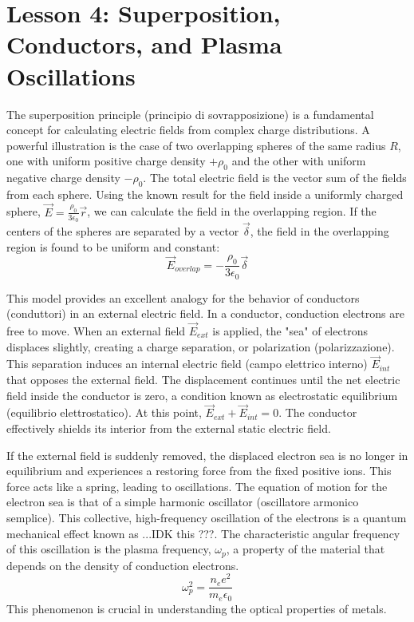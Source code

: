 \section*{Lesson 4: Superposition, Conductors, and Plasma Oscillations}

The superposition principle (principio di sovrapposizione) is a fundamental concept for calculating electric fields from complex charge distributions. A powerful illustration is the case of two overlapping spheres of the same radius $R$, one with uniform positive charge density $+\rho_0$ and the other with uniform negative charge density $-\rho_0$. The total electric field is the vector sum of the fields from each sphere. Using the known result for the field inside a uniformly charged sphere, $\vec{E} = \frac{\rho_0}{3\epsilon_0}\vec{r}$, we can calculate the field in the overlapping region. If the centers of the spheres are separated by a vector $\vec{\delta}$, the field in the overlapping region is found to be uniform and constant:
\begin{equation}
\vec{E}_{overlap} = -\frac{\rho_0}{3\epsilon_0}\vec{\delta}
\end{equation}

This model provides an excellent analogy for the behavior of conductors (conduttori) in an external electric field. In a conductor, conduction electrons are free to move. When an external field $\vec{E}_{ext}$ is applied, the "sea" of electrons displaces slightly, creating a charge separation, or polarization (polarizzazione). This separation induces an internal electric field (campo elettrico interno) $\vec{E}_{int}$ that opposes the external field. The displacement continues until the net electric field inside the conductor is zero, a condition known as electrostatic equilibrium (equilibrio elettrostatico). At this point, $\vec{E}_{ext} + \vec{E}_{int} = 0$. The conductor effectively shields its interior from the external static electric field.

If the external field is suddenly removed, the displaced electron sea is no longer in equilibrium and experiences a restoring force from the fixed positive ions. This force acts like a spring, leading to oscillations. The equation of motion for the electron sea is that of a simple harmonic oscillator (oscillatore armonico semplice). This collective, high-frequency oscillation of the electrons is a quantum mechanical effect known as ...IDK this ???. The characteristic angular frequency of this oscillation is the plasma frequency, $\omega_p$, a property of the material that depends on the density of conduction electrons.
\begin{equation}
\omega_p^2 = \frac{n_e e^2}{m_e\epsilon_0}
\end{equation}
This phenomenon is crucial in understanding the optical properties of metals.
